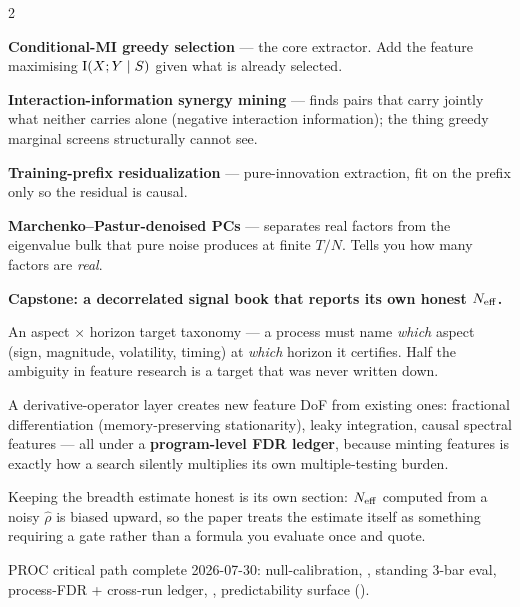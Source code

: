 \documentclass[10pt,a4paper]{article}
\begin{document}
\begin{multicols}{2}
\begin{opnums}
\item \textbf{Conditional-MI greedy selection} — the core extractor. Add the feature maximising
      $\operatorname{I}(X;Y\mid S)$ given what is already selected.
\item \textbf{Interaction-information synergy mining} — finds pairs that carry jointly what neither
      carries alone (negative interaction information); the thing greedy marginal screens structurally
      cannot see.
\item \textbf{Training-prefix residualization} — pure-innovation extraction, fit on the prefix only so
      the residual is causal.
\item \textbf{Marchenko--Pastur-denoised PCs} — separates real factors from the eigenvalue bulk that
      pure noise produces at finite $T/N$. Tells you how many factors are \emph{real}.
\item \textbf{Capstone: a decorrelated signal book that reports its own honest $N_{\mathrm{eff}}$.}
\end{opnums}

An aspect $\times$ horizon target taxonomy — a process must name \emph{which} aspect (sign, magnitude,
volatility, timing) at \emph{which} horizon it certifies. Half the ambiguity in feature research is a
target that was never written down.

A derivative-operator layer creates new feature DoF from existing ones: fractional differentiation
(memory-preserving stationarity), leaky integration, causal spectral features — all under a
\textbf{program-level FDR ledger}, because minting features is exactly how a search silently multiplies
its own multiple-testing burden.

Keeping the breadth estimate honest is its own section: $N_{\mathrm{eff}}$ computed from a noisy $\hat\rho$ is
biased upward, so the paper treats the estimate itself as something requiring a gate rather than a
formula you evaluate once and quote.

PROC critical path complete 2026-07-30: null-calibration, , standing
3-bar eval, process-FDR + cross-run ledger, , predictability surface
().


\end{multicols}
\end{document}
